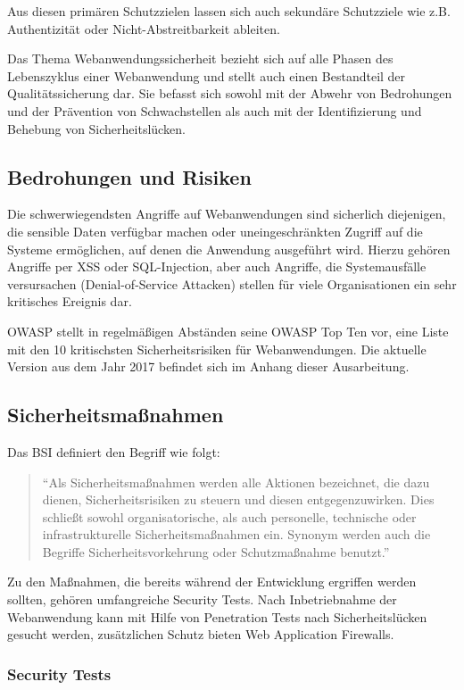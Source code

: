 \documentclass[12pt,oneside,a4paper,parskip]{scrbook}
\begin{document}
  Aus diesen primären Schutzzielen lassen sich auch sekundäre Schutzziele wie z.B. Authentizität oder Nicht-Abstreitbarkeit ableiten.

  Das Thema Webanwendungssicherheit bezieht sich auf alle Phasen des Lebenszyklus einer Webanwendung und stellt auch einen Bestandteil der Qualitätssicherung dar. Sie befasst sich sowohl mit der Abwehr von Bedrohungen und der Prävention von Schwachstellen als auch mit der Identifizierung und Behebung von Sicherheitslücken. \cite{BSI}

  \subsection{Bedrohungen und Risiken}
  Die schwerwiegendsten Angriffe auf Webanwendungen sind sicherlich diejenigen, die sensible Daten verfügbar machen oder uneingeschränkten Zugriff auf die Systeme ermöglichen, auf denen die Anwendung ausgeführt wird.
  Hierzu gehören Angriffe per XSS oder SQL-Injection, aber auch Angriffe, die Systemausfälle versursachen (Denial-of-Service Attacken) stellen für viele Organisationen ein sehr kritisches Ereignis dar.

  OWASP stellt in regelmäßigen Abständen seine OWASP Top Ten vor, eine Liste mit den 10 kritischsten Sicherheitsrisiken für Webanwendungen. Die aktuelle Version aus dem Jahr 2017 befindet sich im Anhang dieser Ausarbeitung.

  \subsection{Sicherheitsmaßnahmen}
  Das BSI definiert den Begriff wie folgt:
    \begin{quote} ``Als Sicherheitsmaßnahmen werden alle Aktionen bezeichnet, die dazu dienen, Sicherheitsrisiken zu steuern und diesen entgegenzuwirken. Dies schließt sowohl organisatorische, als auch personelle, technische oder infrastrukturelle Sicherheitsmaßnahmen ein. Synonym werden auch die Begriffe Sicherheitsvorkehrung oder Schutzmaßnahme benutzt.'' \cite{BSI2}\end{quote}

 Zu den Maßnahmen, die bereits während der Entwicklung ergriffen werden sollten, gehören umfangreiche Security Tests. Nach Inbetriebnahme der Webanwendung kann mit Hilfe von Penetration Tests nach Sicherheitslücken gesucht werden, zusätzlichen Schutz bieten Web Application Firewalls.

  \subsubsection{Security Tests}
\end{document}
